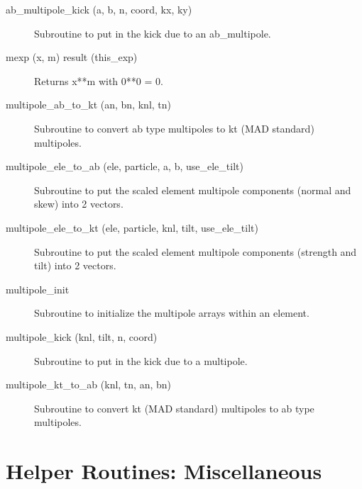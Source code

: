 \begin{description}

\item[ab_multipole_kick (a, b, n, coord, kx, ky)] \Newline 
Subroutine to put in the kick due to an ab_multipole.

\item[mexp (x, m) result (this_exp)] \Newline 
Returns x**m with 0**0 = 0.

\item[multipole_ab_to_kt (an, bn, knl, tn)] \Newline
Subroutine to convert ab type multipoles to kt (MAD standard) multipoles. 

\item[multipole_ele_to_ab (ele, particle, a, b, use_ele_tilt)] \Newline
Subroutine to put the scaled element multipole components (normal and skew) into 2 vectors. 

\item[multipole_ele_to_kt (ele, particle, knl, tilt, use_ele_tilt)] \Newline
Subroutine to put the scaled element multipole components (strength and tilt) 
into 2 vectors. 

\item[multipole_init] \Newline
Subroutine to initialize the multipole arrays within an element.

\item[multipole_kick (knl, tilt, n, coord)] \Newline
Subroutine to put in the kick due to a multipole. 

\item[multipole_kt_to_ab (knl, tn, an, bn)] \Newline
Subroutine to convert kt (MAD standard) multipoles to ab type multipoles. 

\end{description}

\section{Helper Routines: Miscellaneous}
\label{r:misc.help}

